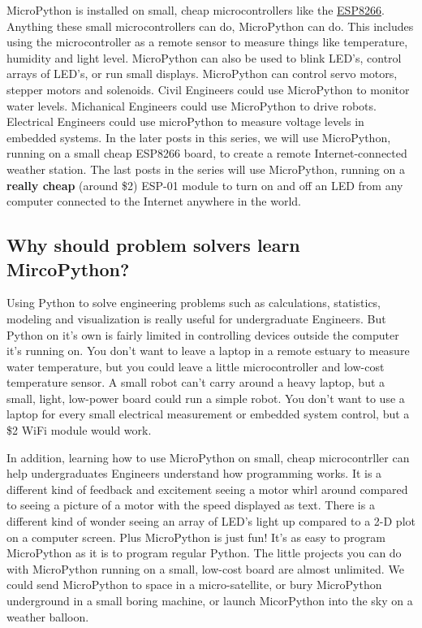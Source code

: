 \documentclass{book}
\begin{document}
    MicroPython is installed on small, cheap microcontrollers like the
\href{https://learn.adafruit.com/adafruit-feather-huzzah-esp8266}{ESP8266}.
Anything these small microcontrollers can do, MicroPython can do. This
includes using the microcontroller as a remote sensor to measure things
like temperature, humidity and light level. MicroPython can also be used
to blink LED's, control arrays of LED's, or run small displays.
MicroPython can control servo motors, stepper motors and solenoids.
Civil Engineers could use MicroPython to monitor water levels.
Michanical Engineers could use MicroPython to drive robots. Electrical
Engineers could use microPython to measure voltage levels in embedded
systems. In the later posts in this series, we will use MicroPython,
running on a small cheap ESP8266 board, to create a remote
Internet-connected weather station. The last posts in the series will
use MicroPython, running on a \textbf{really cheap} (around \$2) ESP-01
module to turn on and off an LED from any computer connected to the
Internet anywhere in the world.

    \subsection{Why should problem solvers learn
MircoPython?}\label{why-should-problem-solvers-learn-mircopython}

    Using Python to solve engineering problems such as calculations,
statistics, modeling and visualization is really useful for
undergraduate Engineers. But Python on it's own is fairly limited in
controlling devices outside the computer it's running on. You don't want
to leave a laptop in a remote estuary to measure water temperature, but
you could leave a little microcontroller and low-cost temperature
sensor. A small robot can't carry around a heavy laptop, but a small,
light, low-power board could run a simple robot. You don't want to use a
laptop for every small electrical measurement or embedded system
control, but a \$2 WiFi module would work.

In addition, learning how to use MicroPython on small, cheap
microcontrller can help undergraduates Engineers understand how
programming works. It is a different kind of feedback and excitement
seeing a motor whirl around compared to seeing a picture of a motor with
the speed displayed as text. There is a different kind of wonder seeing
an array of LED's light up compared to a 2-D plot on a computer screen.
Plus MicroPython is just fun! It's as easy to program MicroPython as it
is to program regular Python. The little projects you can do with
MicroPython running on a small, low-cost board are almost unlimited. We
could send MicroPython to space in a micro-satellite, or bury
MicroPython underground in a small boring machine, or launch MicorPython
into the sky on a weather balloon.
\end{document}
